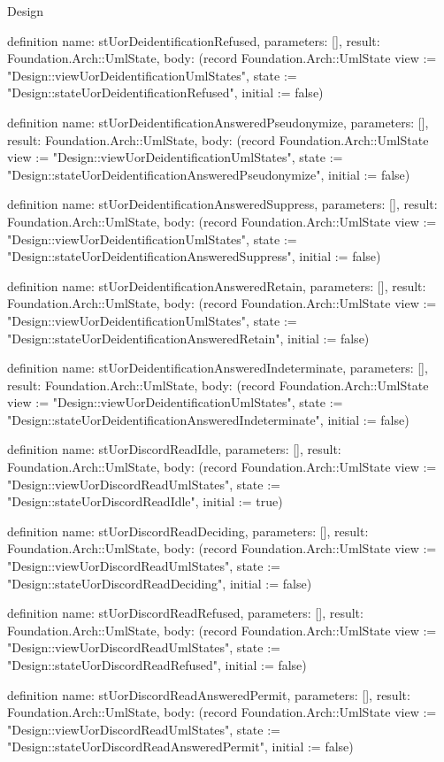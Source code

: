 \begin{lexlean}{Design}
\begin{semanticmodule}
definition{
  name: stUorDeidentificationRefused,
  parameters: [],
  result: Foundation.Arch::UmlState,
  body: (record Foundation.Arch::UmlState {view := "Design::viewUorDeidentificationUmlStates", state := "Design::stateUorDeidentificationRefused", initial := false})
}

definition{
  name: stUorDeidentificationAnsweredPseudonymize,
  parameters: [],
  result: Foundation.Arch::UmlState,
  body: (record Foundation.Arch::UmlState {view := "Design::viewUorDeidentificationUmlStates", state := "Design::stateUorDeidentificationAnsweredPseudonymize", initial := false})
}

definition{
  name: stUorDeidentificationAnsweredSuppress,
  parameters: [],
  result: Foundation.Arch::UmlState,
  body: (record Foundation.Arch::UmlState {view := "Design::viewUorDeidentificationUmlStates", state := "Design::stateUorDeidentificationAnsweredSuppress", initial := false})
}

definition{
  name: stUorDeidentificationAnsweredRetain,
  parameters: [],
  result: Foundation.Arch::UmlState,
  body: (record Foundation.Arch::UmlState {view := "Design::viewUorDeidentificationUmlStates", state := "Design::stateUorDeidentificationAnsweredRetain", initial := false})
}

definition{
  name: stUorDeidentificationAnsweredIndeterminate,
  parameters: [],
  result: Foundation.Arch::UmlState,
  body: (record Foundation.Arch::UmlState {view := "Design::viewUorDeidentificationUmlStates", state := "Design::stateUorDeidentificationAnsweredIndeterminate", initial := false})
}

definition{
  name: stUorDiscordReadIdle,
  parameters: [],
  result: Foundation.Arch::UmlState,
  body: (record Foundation.Arch::UmlState {view := "Design::viewUorDiscordReadUmlStates", state := "Design::stateUorDiscordReadIdle", initial := true})
}

definition{
  name: stUorDiscordReadDeciding,
  parameters: [],
  result: Foundation.Arch::UmlState,
  body: (record Foundation.Arch::UmlState {view := "Design::viewUorDiscordReadUmlStates", state := "Design::stateUorDiscordReadDeciding", initial := false})
}

definition{
  name: stUorDiscordReadRefused,
  parameters: [],
  result: Foundation.Arch::UmlState,
  body: (record Foundation.Arch::UmlState {view := "Design::viewUorDiscordReadUmlStates", state := "Design::stateUorDiscordReadRefused", initial := false})
}

definition{
  name: stUorDiscordReadAnsweredPermit,
  parameters: [],
  result: Foundation.Arch::UmlState,
  body: (record Foundation.Arch::UmlState {view := "Design::viewUorDiscordReadUmlStates", state := "Design::stateUorDiscordReadAnsweredPermit", initial := false})
}


\end{semanticmodule}
\end{lexlean}
